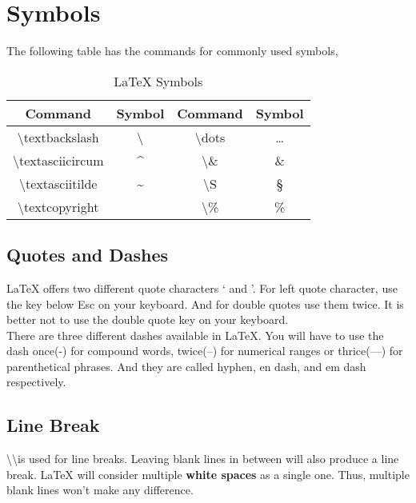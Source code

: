 \documentclass{article}
\begin{document}
\section{Symbols}
The following table has the commands for commonly used symbols,
\begin{table}[h]
\centering
\begin{tabular}{|c|c||c|c|}
	\hline
	\textbf{Command} & \textbf{Symbol} & \textbf{Command} & \textbf{Symbol} \\ \hline
	\textbackslash textbackslash & \textbackslash & \textbackslash dots & \dots \\ \hline
	\textbackslash textasciicircum & \textasciicircum & \textbackslash \& & \& \\ \hline
	\textbackslash textasciitilde & \textasciitilde & \textbackslash S & \S \\ \hline
	\textbackslash textcopyright & \textcopyright & \textbackslash \% & \% \\ \hline
\end{tabular}
	\caption{\LaTeX{} Symbols}
\end{table}

\subsection{Quotes and Dashes}
\LaTeX{} offers two different quote characters ` and '. For left quote character, use the key below Esc on your keyboard. And for double quotes use them twice. It is better not to use the double quote key on your keyboard.\\

There are three different dashes available in \LaTeX{}. You will have to use the dash once(-) for compound words, twice(--) for numerical ranges or thrice(---) for parenthetical phrases. And they are called hyphen, en dash, and em dash respectively.

\subsection{Line Break}
\textbackslash\textbackslash is used for line breaks. Leaving blank lines in between will also produce a line break. \LaTeX{} will consider multiple \textbf{white spaces} as a single one. Thus, multiple blank lines won't make any difference.

\end{document}

